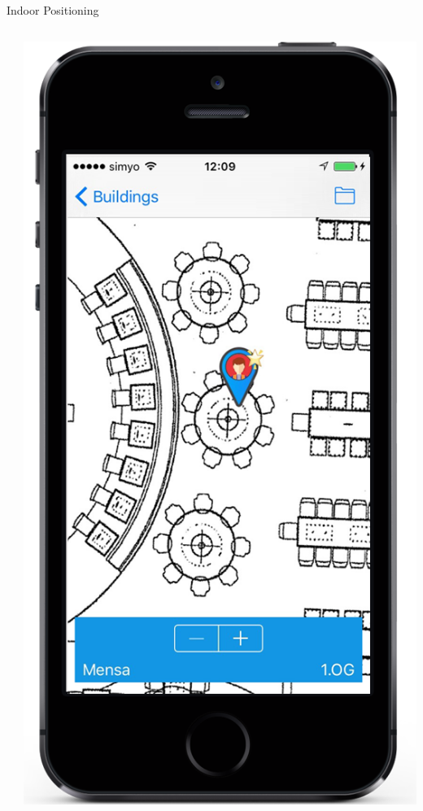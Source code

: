 \documentclass[11pt]{beamer}
\begin{document}
\begin{frame}{Indoor Positioning}
\begin{columns}[T]
\begin{column}{.6\textwidth}
\begin{itemize}
  \end{itemize}
  \end{column}
  \begin{column}{.4\textwidth}
  \includegraphics[scale=0.25]{mappinpointb}
  \end{column}
\end{columns}

\end{frame}
\end{document}
